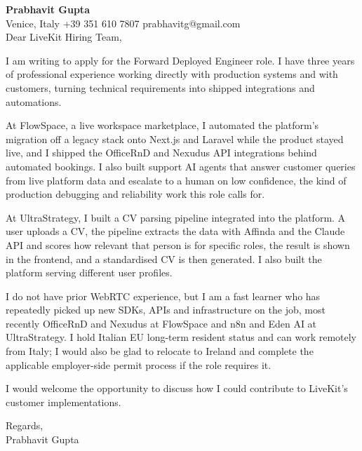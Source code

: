 \documentclass[a4paper,10.5pt]{article}
\begin{document}
\textbf{Prabhavit Gupta}\\
Venice, Italy \textbar{} +39 351 610 7807 \textbar{} prabhavitg@gmail.com\\[10pt]
Dear LiveKit Hiring Team,

I am writing to apply for the Forward Deployed Engineer role. I have three years of professional experience working directly with production systems and with customers, turning technical requirements into shipped integrations and automations.

At FlowSpace, a live workspace marketplace, I automated the platform's migration off a legacy stack onto Next.js and Laravel while the product stayed live, and I shipped the OfficeRnD and Nexudus API integrations behind automated bookings. I also built support AI agents that answer customer queries from live platform data and escalate to a human on low confidence, the kind of production debugging and reliability work this role calls for.

At UltraStrategy, I built a CV parsing pipeline integrated into the platform. A user uploads a CV, the pipeline extracts the data with Affinda and the Claude API and scores how relevant that person is for specific roles, the result is shown in the frontend, and a standardised CV is then generated. I also built the platform serving different user profiles.

I do not have prior WebRTC experience, but I am a fast learner who has repeatedly picked up new SDKs, APIs and infrastructure on the job, most recently OfficeRnD and Nexudus at FlowSpace and n8n and Eden AI at UltraStrategy. I hold Italian EU long-term resident status and can work remotely from Italy; I would also be glad to relocate to Ireland and complete the applicable employer-side permit process if the role requires it.

I would welcome the opportunity to discuss how I could contribute to LiveKit's customer implementations.

Regards,\\
Prabhavit Gupta
\end{document}
